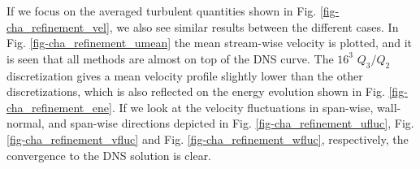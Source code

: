 If we focus on the averaged turbulent quantities shown in Fig. \ref{fig-cha_refinement_vel}, we also see similar results between the different cases. In Fig. \ref{fig-cha_refinement_umean} the mean stream-wise velocity is plotted, and it is seen that all methods are almost on top of the DNS curve. The $16^3$ $Q_3/Q_2$ discretization gives  a mean velocity profile slightly lower than the other discretizations, which is also reflected on the energy evolution shown in Fig. \ref{fig-cha_refinement_ene}. If we look at the velocity fluctuations in span-wise, wall-normal, and span-wise directions depicted in Fig. \ref{fig-cha_refinement_ufluc}, Fig. \ref{fig-cha_refinement_vfluc} and Fig. \ref{fig-cha_refinement_wfluc}, respectively, the convergence to the DNS solution is clear.
\begin{figure}[h!]
	\centering	
	\\   

\end{figure}
